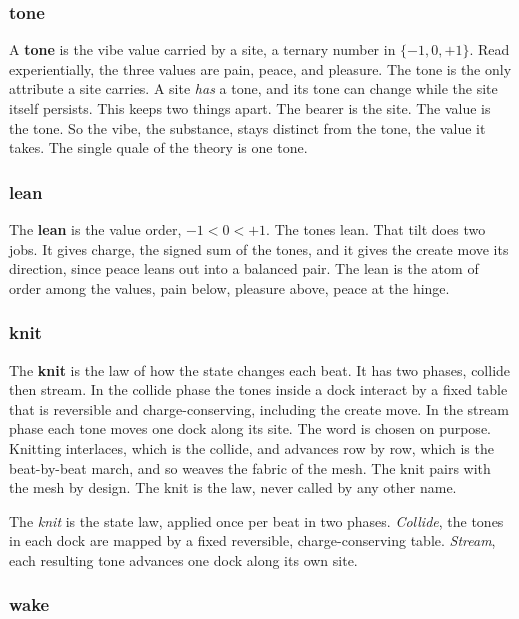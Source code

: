 \subsubsection{tone}

A \textbf{tone} is the vibe value carried by a site, a ternary number in $\{-1, 0, +1\}$. Read experientially, the three values are pain, peace, and pleasure. The tone is the only attribute a site carries. A site \emph{has} a tone, and its tone can change while the site itself persists. This keeps two things apart. The bearer is the site. The value is the tone. So the vibe, the substance, stays distinct from the tone, the value it takes. The single quale of the theory is one tone.

\subsubsection{lean}

The \textbf{lean} is the value order, $-1 < 0 < +1$. The tones lean. That tilt does two jobs. It gives charge, the signed sum of the tones, and it gives the create move its direction, since peace leans out into a balanced pair. The lean is the atom of order among the values, pain below, pleasure above, peace at the hinge.

\subsubsection{knit}

The \textbf{knit} is the law of how the state changes each beat. It has two phases, collide then stream. In the collide phase the tones inside a dock interact by a fixed table that is reversible and charge-conserving, including the create move. In the stream phase each tone moves one dock along its site. The word is chosen on purpose. Knitting interlaces, which is the collide, and advances row by row, which is the beat-by-beat march, and so weaves the fabric of the mesh. The knit pairs with the mesh by design. The knit is the law, never called by any other name.

\begin{definition}
The \emph{knit} is the state law, applied once per beat in two phases. \emph{Collide}, the tones in each dock are mapped by a fixed reversible, charge-conserving table. \emph{Stream}, each resulting tone advances one dock along its own site.
\end{definition}

\subsubsection{wake}


